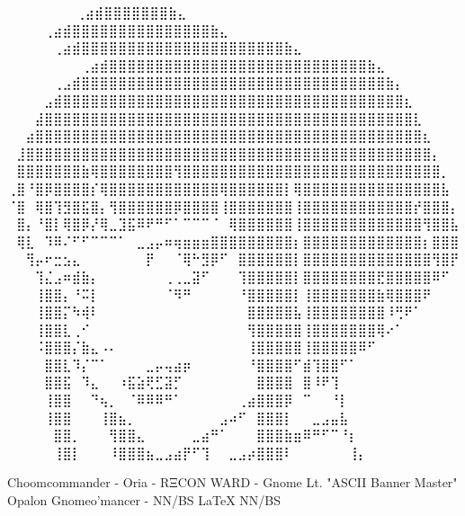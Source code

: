   ⠀⠀⠀⠀⠀             ⠀⠀⢀⣴⣾⣿⣿⣿⣿⣿⣿⣿⣷⣄⠀⠀⠀⠀⠀⠀⠀⠀
⠀⠀⠀  ⠀      ⠀⠀⠀⠀⢀⣴⣾⣿⣿⣿⣿⣿⣿⣿⣿⣿⣿⣿⣿⣿⣿⣿⣷⣄⠀⠀⠀⠀⠀⠀⠀⠀
⠀⠀ ⠀   ⠀⠀⠀⠀⠀⢀⣴⣾⣿⣿⣿⣿⣿⣿⣿⣿⣿⣿⣿⣿⣿⣿⣿⣿⣿⣿⣿⣿⣿⣿⣷⣄⠀⠀⠀⠀⠀⠀⠀⠀
⠀⠀⠀⠀⠀⠀⠀⠀⢀⣴⣾⣿⣿⣿⣿⣿⣿⣿⣿⣿⣿⣿⣿⣿⣿⣿⣿⣿⣿⣿⣿⣿⣿⣿⣿⣿⣿⣿⣿⣷⣄⠀⠀⠀⠀⠀⠀⠀⠀
⠀⠀⠀⠀⠀⢀⣠⣾⣿⣿⣿⣿⣿⣿⣿⣿⣿⣿⣿⣿⣿⣿⣿⣿⣿⣿⣿⣿⣿⣿⣿⣿⣿⣿⣿⣿⣿⣿⣿⣿⣿⣷⡄⠀⠀⠀⠀⠀⠀
⠀⠀⠀⠀⣠⣾⣿⣿⣿⣿⣿⣿⣿⣿⣿⣿⣿⣿⣿⣿⣿⣿⣿⣿⣿⣿⣿⣿⣿⣿⣿⣿⣿⣿⣿⣿⣿⣿⣿⣿⣿⣿⣿⣆⠀⠀⠀⠀⠀
⠀⠀⠀⣼⣿⣿⣿⣿⣿⣿⣿⣿⣿⣿⣿⣿⣿⣿⣿⣿⣿⣿⣿⣿⣿⣿⣿⣿⣿⣿⣿⣿⣿⣿⣿⣿⣿⣿⣿⣿⣿⣿⣿⣿⣇⠀⠀⠀⠀
⠀⠀⣴⣿⣿⣿⣿⣿⣿⣿⣿⣿⣿⣿⣿⣿⣿⣿⣿⣿⣿⣿⣿⣿⣿⣿⣿⣿⣿⣿⣿⣿⣿⣿⣿⣿⣿⣿⣿⣿⣿⣿⣿⣿⣿⣆⠀⠀⠀
⠀⣸⣿⣿⣿⣿⣿⣿⣿⣿⣿⣿⣿⣿⣿⣿⣿⣿⣿⣿⣿⣿⣿⣿⣿⣿⣿⣿⣿⣿⣿⣿⣿⣿⣿⣿⣿⣿⣿⣿⣿⣿⣿⣿⣿⣿⡄⠀⠀
⠀⣿⣿⣿⣿⣿⣿⣿⣷⢿⣿⣿⣿⣿⣿⣿⣿⣿⢻⣿⣿⣿⣿⣿⣿⣿⣿⣿⣿⣿⣿⣿⣿⣿⣿⣿⣿⣿⣿⣿⣿⣿⣿⣿⣿⣿⣿⡀⠀
⢀⣿⠘⣿⡿⣿⣿⣿⣿⡎⢿⣿⣿⣿⣿⣿⣿⣿⣿⣿⣿⣿⣿⢿⣿⣿⣿⣿⣿⣿⡇⢿⣿⣿⣿⣿⣿⣿⣿⣿⣿⣿⣿⣿⣿⣿⣿⣧⠀
⠈⣿⠀⢿⣿⢹⣻⣿⣯⣿⡄⢻⣿⣿⣿⣿⣿⣿⡿⣿⣿⣿⣿⢸⣿⣿⣿⣿⣿⣿⣿⢸⣿⣿⣿⣿⣿⣿⣿⣿⣿⣿⣿⣿⡞⣿⣿⣿⡄
⠀⣿⡄⠘⣿⡇⢿⣿⡿⡜⢿⣀⣹⣯⠿⠟⠛⠋⠁⠉⠉⠉⠈⠀⢿⣿⣿⣿⣿⣿⣿⢸⣿⣿⣿⣿⣿⣿⣿⣿⣿⣿⣿⣿⣿⢻⣿⣿⣧
⠀⢿⣇⠀⠹⠿⠌⠋⠋⠉⠉⠉⠁⠀⣀⣠⡤⠶⢶⣶⣶⣶⣿⣿⣿⣿⣿⣿⣿⣿⣿⡆⣿⣿⣿⣿⣿⣿⣿⣿⣿⣿⣿⣿⣿⡆⣿⣿⣿
⠀⠀⢻⡤⠖⣒⣢⣄⠀⠀⠀⠀⠀⠀⠀⡟⠀⠀⠈⢿⠓⣻⡿⠋⠀⣿⣿⣿⣿⣿⣿⡇⣿⣿⣿⣿⣿⣿⣿⣿⣿⣿⣿⣿⣿⣿⢻⣿⡟
⠀⠀⠀⢹⣌⣠⠶⣾⣷⡄⠀⠀⠀⠀⠀⠀⠀⢀⢀⣀⣽⠋⠀⠀⠀⢹⣿⣿⣿⣿⣿⡇⣿⣿⣿⣿⣿⣿⣿⣿⣟⣿⣿⣿⣿⣿⠿⠋⠀
⠀⠀⠀⢸⣿⣿⡄⠘⠭⡇⠀⠀⠀⠀⠀⠀⠀⠈⠻⠛⠀⠀⠀⠀⠀⠘⣿⣿⣿⣿⣿⡇⢸⣿⣿⣿⣿⣿⣿⣿⣷⢿⣿⣿⣿⠟⠀⠀⠀
⠀⠀⠀⢸⣿⣿⡍⠳⢾⠇⠀⠀⠀⠀⠀⠀⠀⠀⠀⠀⠀⠀⠀⠀⠀⠀⣿⣿⣿⣿⣿⣧⢸⣿⣿⣿⣿⣿⣿⣿⣿⠸⢛⠟⠁⠀⠀⠀⠀
⠀⠀⠀⢸⣿⣿⣇⢀⠊⠀⠀⠀⠀⠀⠀⠀⠀⠀⠀⠀⠀⠀⠀⠀⠀⠀⢻⣿⣿⣿⣿⣿⢸⣿⣿⣿⣿⣿⣿⣿⢿⠔⠁⠀⠀⠀⠀⠀⠀
⠀⠀⠀⠨⣿⣿⣿⡌⣷⣄⠠⠄⠀⠀⠀⠀⠀⠀⠀⠀⠀⠀⠀⠀⠀⠀⢸⣿⣿⣿⣿⣿⢸⣿⣿⣿⣿⣿⠿⠋⠀⠀⠀⠀⠀⠀⠀⠀⠀
⠀⠀⠀⠀⣿⣿⣇⠹⡌⠉⠁⠀⠀⠀⠀⣀⡤⢤⣴⡶⠀⠀⠀⠀⠀⠀⠘⣿⣿⣿⣿⠋⣾⢹⣿⣿⠋⠁⠀⠀⠀⠀⠀⠀⠀⠀⠀⠀⠀
⠀⠀⠀⠀⣿⣿⣯⠀⠹⣄⠀⠀⠰⣯⣵⢟⣋⣽⡋⠀⠀⠀⠀⠀⠀⠀⠀⣿⣿⣿⣿⠀⣿⠸⠟⢹⠀⠀⠀⠀⠀⠀⠀⠀⠀⠀⠀⠀⠀
⠀⠀⠀⠀⢸⣿⣿⠀⠀⠙⢦⡀⠀⠈⠿⠿⠿⠛⠁⠀⠀⠀⠀⠀⠀⢀⣴⣿⣿⣿⡿⠀⠉⠀⠀⠘⡇⠀⠀⠀⠀⠀⠀⠀⠀⠀⠀⠀⠀
⠀⠀⠀⠀⢸⣿⣿⠀⠀⠀⢸⣿⣦⡀⠀⠀⠀⠀⠀⠀⠀⠀⠀⣠⠴⠋⠀⣿⣿⣿⡇⠀⠀⣀⣠⣤⣧⠀⠀⠀⠀⠀⠀⠀⠀⠀⠀⠀⠀
⠀⠀⠀⠀⠀⣿⣿⡀⠀⠀⠀⢻⣿⣿⣄⠀⠀⠀⠀⠀⣀⣴⠛⠁⠀⠀⠀⣿⣿⣿⣷⣶⠿⠛⠋⠉⠘⡆⠀⠀⠀⠀⠀⠀⠀⠀⠀⠀⠀
⠀⠀⠀⠀⠀⢸⣿⡇⠀⠀⠀⠸⣿⣿⣿⣦⣀⣠⣴⡟⠋⢹⠀⠀⣀⣠⡴⣿⣿⣿⠇⠀⠀⠀⠀⠀⠀⢸⡄⠀⠀⠀⠀⠀⠀⠀⠀⠀⠀

Choomcommander - Oria - RΞCON WARD - Gnome Lt. "ASCII Banner Master"
             Opalon Gnomeo'mancer - NN/BS LaTeX{} NN/BS

